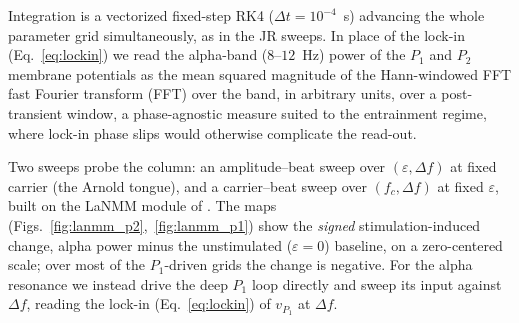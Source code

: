 \documentclass[11pt,a4paper]{article}
\providecommand{\DIFaddtex}[1]{{\protect\color{blue} \sf #1}} %
\providecommand{\DIFdeltex}[1]{{\protect\color{red} \scriptsize #1}} %
\providecommand{\DIFaddbegin}{} %
\providecommand{\DIFaddend}{} %
\providecommand{\DIFdelbegin}{} %
\providecommand{\DIFdelend}{} %
\providecommand{\DIFadd}[1]{\texorpdfstring{\DIFaddtex{#1}}{#1}} %
\providecommand{\DIFdel}[1]{\texorpdfstring{\DIFdeltex{#1}}{}} %
\begin{document}
\DIFaddend Integration is a vectorized fixed-step RK4
($\Delta t=10^{-4}$~s) advancing the whole parameter grid simultaneously, as in the JR
sweeps. In place of the lock-in (Eq.~\eqref{eq:lockin}) we read the
alpha-band ($8$--$12$~Hz) power of the $P_1$ and $P_2$ membrane potentials as the mean
squared magnitude of the Hann-windowed \DIFdelbegin \DIFdel{FFT }\DIFdelend \DIFaddbegin \DIFadd{fast Fourier transform (FFT) }\DIFaddend over the band, in arbitrary units, over a
post-transient window, a phase-agnostic measure suited to the entrainment regime, where
lock-in phase slips would otherwise complicate the read-out.
\DIFaddbegin 

\DIFaddend Two sweeps probe the column: an amplitude--beat sweep over
$(\varepsilon,\Delta f)$ at fixed carrier (the Arnold tongue), and a carrier--beat sweep
over $(f_c,\Delta f)$ at fixed $\varepsilon$, built on the LaNMM module of
\cite{ruffini2025cfc}. The maps
(Figs.~\ref{fig:lanmm_p2},~\ref{fig:lanmm_p1}) show the \emph{signed} stimulation-induced
change, alpha power minus the unstimulated ($\varepsilon=0$) baseline, on a zero-centered
scale; over most of the $P_1$-driven grids the change is negative. For the
alpha resonance we instead drive the deep $P_1$ loop directly and sweep its input against
$\Delta f$, reading the lock-in (Eq.~\eqref{eq:lockin}) of $v_{P_1}$ at $\Delta f$.
\end{document}
